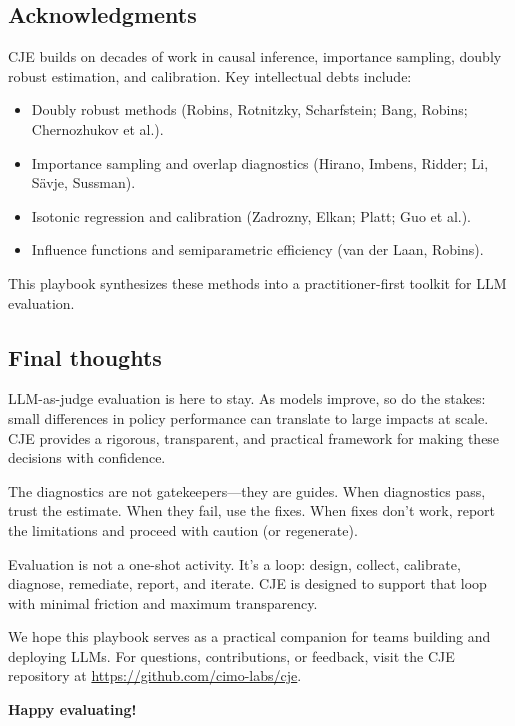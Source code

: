 \subsection{Acknowledgments}

CJE builds on decades of work in causal inference, importance sampling, doubly robust estimation, and calibration. Key intellectual debts include:
\begin{itemize}
\item Doubly robust methods (Robins, Rotnitzky, Scharfstein; Bang, Robins; Chernozhukov et al.).
\item Importance sampling and overlap diagnostics (Hirano, Imbens, Ridder; Li, Sävje, Sussman).
\item Isotonic regression and calibration (Zadrozny, Elkan; Platt; Guo et al.).
\item Influence functions and semiparametric efficiency (van der Laan, Robins).
\end{itemize}

This playbook synthesizes these methods into a practitioner-first toolkit for LLM evaluation.

\subsection{Final thoughts}

LLM-as-judge evaluation is here to stay. As models improve, so do the stakes: small differences in policy performance can translate to large impacts at scale. CJE provides a rigorous, transparent, and practical framework for making these decisions with confidence.

The diagnostics are not gatekeepers---they are guides. When diagnostics pass, trust the estimate. When they fail, use the fixes. When fixes don't work, report the limitations and proceed with caution (or regenerate).

Evaluation is not a one-shot activity. It's a loop: design, collect, calibrate, diagnose, remediate, report, and iterate. CJE is designed to support that loop with minimal friction and maximum transparency.

We hope this playbook serves as a practical companion for teams building and deploying LLMs. For questions, contributions, or feedback, visit the CJE repository at \url{https://github.com/cimo-labs/cje}.

\vspace{1em}
\noindent\textbf{Happy evaluating!}

